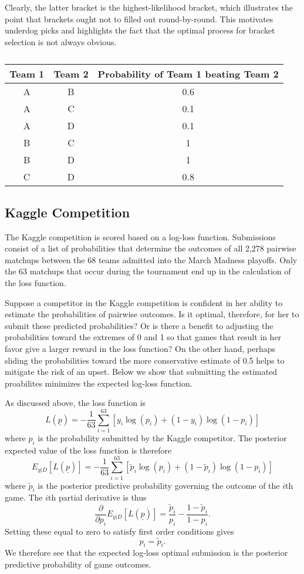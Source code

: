 Clearly, the latter bracket is the highest-likelihood bracket, which illustrates the point that brackets ought not to filled out round-by-round. This motivates underdog picks and highlights the fact that the optimal process for bracket selection is not always obvious.

\begin{table}
	\centering
	\begin{tabular}{|cc|c|}
		\hline
		Team 1	&	Team 2	&	Probability of Team 1 beating Team 2 \\
		\hline
		A 		&	B 		&	0.6\\
		A 		&	C 		& 	0.1\\
		A 		& 	D 		& 	0.1\\
		B 		&	C 		&	1\\
		B 		& 	D 		&	1\\
		C 		& 	D 		& 	0.8\\
		\hline
	\end{tabular}
	\caption{\label{tab:hypothetical}}
\end{table}

\subsection{Kaggle Competition}

The Kaggle competition is scored based on a log-loss function. Submissions consist of a list of probabilities that determine the outcomes of all 2,278 pairwise matchups between the 68 teams admitted into the March Madness playoffs. Only the 63 matchups that occur during the tournament end up in the calculation of the loss function.

Suppose a competitor in the Kaggle competition is confident in her ability to estimate the probabilities of pairwise outcomes. Is it optimal, therefore, for her to submit these predicted probabilities? Or is there a benefit to adjusting the probabilities toward the extremes of 0 and 1 so that games that result in her favor give a larger reward in the loss function? On the other hand, perhaps sliding the probabilities toward the more conservative estimate of 0.5 helps to mitigate the risk of an upset. Below we show that submitting the estimated proabilites minimizes the expected log-loss function. 

As discussed above, the loss function is 
$$
L(\underline{p})=-\frac{1}{63}\sum_{i=1}^{63}\left[y_i\log(p_i)+(1-y_i)\log(1-p_i)\right]
$$
where $p_i$ is the probability submitted by the Kaggle competitor. The posterior expected value of the loss function is therefore 
$$
E_{y|D}[L(\underline{p})]=-\frac{1}{63}\sum_{i=1}^{63}\left[\tilde{p}_i\log(p_i)+(1-\tilde{p}_i)\log(1-p_i)\right]
$$
where $\tilde{p}_i$ is the posterior predictive probability governing the outcome of the $i$th game. The $i$th partial derivative is thus
$$
\frac{\partial}{\partial p_i} E_{y|D}[L(\underline{p})] = \frac{\tilde{p}_i}{p_i}-\frac{1-\tilde{p}_i}{1-p_i}.
$$
Setting these equal to zero to satisfy first order conditions gives
$$
p_i=\tilde{p}_i.
$$
We therefore see that the expected log-loss optimal submission is the posterior predictive probability of game outcomes.

